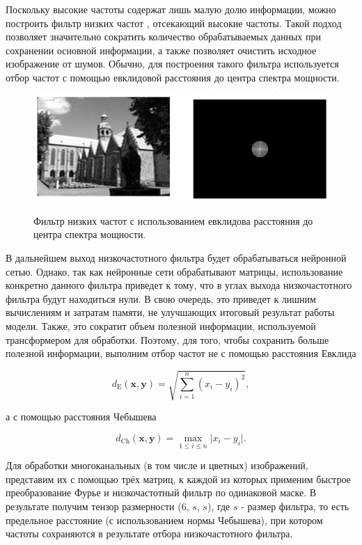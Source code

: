 Поскольку высокие частоты содержат лишь малую долю информации, можно построить фильтр низких частот \cite{low_pass_filter}, отсекающий высокие частоты. Такой подход позволяет значительно сократить количество обрабатываемых данных при сохранении основной информации, а также позволяет очистить исходное изображение от шумов. Обычно, для построения такого фильтра используется отбор частот с помощью евклидовой расстояния до центра спектра мощности.

\begin{figure}[H]
    \centering
    \includegraphics[width=1.0\textwidth]
    {images/solutions_analysis/fourier/low_pass_filter.png}
    \label{fig:svd_approx_im_fix_rank}
    \caption{Фильтр низких частот с использованием евклидова расстояния до центра спектра мощности.}
\end{figure}

В дальнейшем выход низкочастотного фильтра будет обрабатываться нейронной сетью. Однако, так как нейронные сети обрабатывают матрицы, использование конкретно данного фильтра приведет к тому, что в углах выхода низкочастотного фильтра будут находиться нули. В свою очередь, это приведет к лишним вычислениям и затратам памяти, не улучшающих итоговый результат работы модели. Также, это сократит объем полезной информации, используемой трансформером для обработки. Поэтому, для того, чтобы сохранить больше полезной информации, выполним отбор частот не с помощью расстояния Евклида

$$
d_{\mathrm{E}}(\mathbf{x}, \mathbf{y})
= \sqrt{\sum_{i=1}^{n} (x_i - y_i)^2},
$$

а с помощью расстояния Чебышева

$$
d_{\mathrm{Ch}}(\mathbf{x}, \mathbf{y})
= \max_{1 \le i \le n} \bigl|x_i - y_i\bigr|.
$$


Для обработки многоканальных (в том числе и цветных) изображений, представим их с помощью трёх матриц, к каждой из которых применим быстрое преобразование Фурье и низкочастотный фильтр по одинаковой маске. В результате получим тензор размерности (6, $s$, $s$), где $s$ - размер фильтра, то есть предельное расстояние (с использованием нормы Чебышева), при котором частоты сохраняются в результате отбора низкочастотного фильтра.

